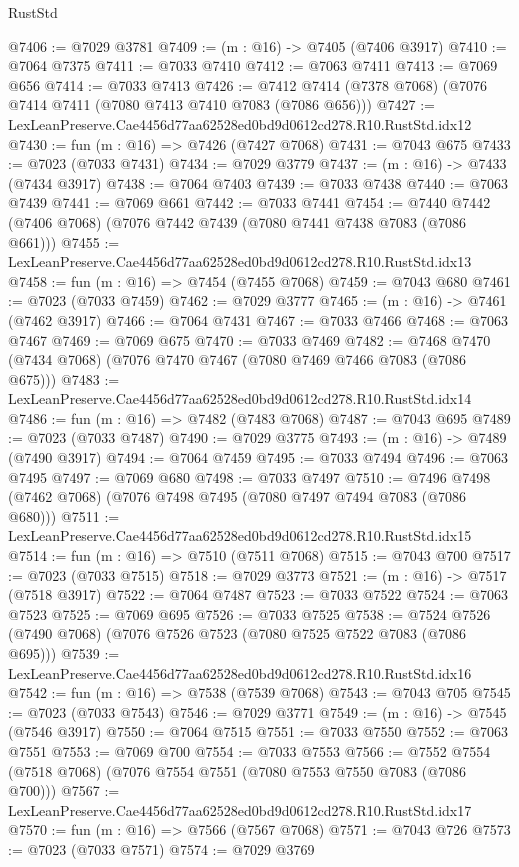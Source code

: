 \begin{lexlean}{RustStd}
\begin{coremodule}
@7406 := @7029 @3781
@7409 := (m : @16) -> @7405 (@7406 @3917)
@7410 := @7064 @7375
@7411 := @7033 @7410
@7412 := @7063 @7411
@7413 := @7069 @656
@7414 := @7033 @7413
@7426 := @7412 @7414 (@7378 @7068) (@7076 @7414 @7411 (@7080 @7413 @7410 @7083 (@7086 @656)))
@7427 := LexLeanPreserve.Cae4456d77aa62528ed0bd9d0612cd278.R10.RustStd.idx12
@7430 := fun (m : @16) => @7426 (@7427 @7068)
@7431 := @7043 @675
@7433 := @7023 (@7033 @7431)
@7434 := @7029 @3779
@7437 := (m : @16) -> @7433 (@7434 @3917)
@7438 := @7064 @7403
@7439 := @7033 @7438
@7440 := @7063 @7439
@7441 := @7069 @661
@7442 := @7033 @7441
@7454 := @7440 @7442 (@7406 @7068) (@7076 @7442 @7439 (@7080 @7441 @7438 @7083 (@7086 @661)))
@7455 := LexLeanPreserve.Cae4456d77aa62528ed0bd9d0612cd278.R10.RustStd.idx13
@7458 := fun (m : @16) => @7454 (@7455 @7068)
@7459 := @7043 @680
@7461 := @7023 (@7033 @7459)
@7462 := @7029 @3777
@7465 := (m : @16) -> @7461 (@7462 @3917)
@7466 := @7064 @7431
@7467 := @7033 @7466
@7468 := @7063 @7467
@7469 := @7069 @675
@7470 := @7033 @7469
@7482 := @7468 @7470 (@7434 @7068) (@7076 @7470 @7467 (@7080 @7469 @7466 @7083 (@7086 @675)))
@7483 := LexLeanPreserve.Cae4456d77aa62528ed0bd9d0612cd278.R10.RustStd.idx14
@7486 := fun (m : @16) => @7482 (@7483 @7068)
@7487 := @7043 @695
@7489 := @7023 (@7033 @7487)
@7490 := @7029 @3775
@7493 := (m : @16) -> @7489 (@7490 @3917)
@7494 := @7064 @7459
@7495 := @7033 @7494
@7496 := @7063 @7495
@7497 := @7069 @680
@7498 := @7033 @7497
@7510 := @7496 @7498 (@7462 @7068) (@7076 @7498 @7495 (@7080 @7497 @7494 @7083 (@7086 @680)))
@7511 := LexLeanPreserve.Cae4456d77aa62528ed0bd9d0612cd278.R10.RustStd.idx15
@7514 := fun (m : @16) => @7510 (@7511 @7068)
@7515 := @7043 @700
@7517 := @7023 (@7033 @7515)
@7518 := @7029 @3773
@7521 := (m : @16) -> @7517 (@7518 @3917)
@7522 := @7064 @7487
@7523 := @7033 @7522
@7524 := @7063 @7523
@7525 := @7069 @695
@7526 := @7033 @7525
@7538 := @7524 @7526 (@7490 @7068) (@7076 @7526 @7523 (@7080 @7525 @7522 @7083 (@7086 @695)))
@7539 := LexLeanPreserve.Cae4456d77aa62528ed0bd9d0612cd278.R10.RustStd.idx16
@7542 := fun (m : @16) => @7538 (@7539 @7068)
@7543 := @7043 @705
@7545 := @7023 (@7033 @7543)
@7546 := @7029 @3771
@7549 := (m : @16) -> @7545 (@7546 @3917)
@7550 := @7064 @7515
@7551 := @7033 @7550
@7552 := @7063 @7551
@7553 := @7069 @700
@7554 := @7033 @7553
@7566 := @7552 @7554 (@7518 @7068) (@7076 @7554 @7551 (@7080 @7553 @7550 @7083 (@7086 @700)))
@7567 := LexLeanPreserve.Cae4456d77aa62528ed0bd9d0612cd278.R10.RustStd.idx17
@7570 := fun (m : @16) => @7566 (@7567 @7068)
@7571 := @7043 @726
@7573 := @7023 (@7033 @7571)
@7574 := @7029 @3769

\end{coremodule}
\end{lexlean}
